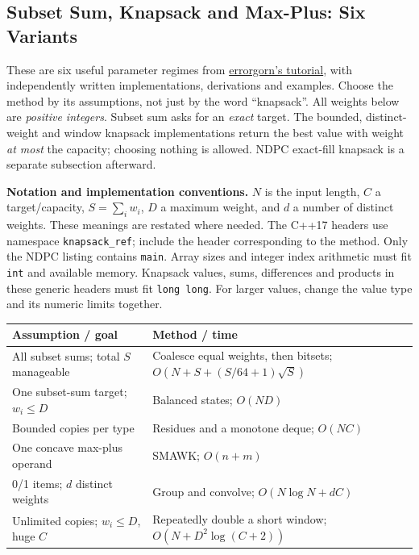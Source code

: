 \begingroup
\raggedright
\subsection{Subset Sum, Knapsack and Max-Plus: Six Variants}
\label{sec:knapsack-six}
These are six useful parameter regimes from
\href{https://codeforces.com/blog/entry/98663}{errorgorn's tutorial},
with independently written implementations, derivations and examples.
Choose the method by its assumptions, not just by the word ``knapsack''.
All weights below are \emph{positive integers}. Subset sum asks for an
\emph{exact} target. The bounded, distinct-weight and window knapsack
implementations return the best value with weight \emph{at most} the
capacity; choosing nothing is allowed. NDPC exact-fill knapsack is a
separate subsection afterward.

\textbf{Notation and implementation conventions.}
$N$ is the input length, $C$ a target/capacity, $S=\sum_i w_i$,
$D$ a maximum weight, and $d$ a number of distinct weights.
These meanings are restated where needed.
The C++17 headers use namespace \texttt{knapsack\_ref}; include the
header corresponding to the method. Only the NDPC listing contains
\texttt{main}. Array sizes and integer index arithmetic must fit
\texttt{int} and available memory. Knapsack values, sums, differences
and products in these generic headers must fit \texttt{long long}.
For larger values, change the value type and its numeric limits together.

\begin{center}
\begin{tabular}{p{}p{}}
\textbf{Assumption / goal} & \textbf{Method / time} \\
\hline
All subset sums; total $S$ manageable & Coalesce equal weights, then bitsets; $O(N+S+(S/64+1)\sqrt S)$ \\
One subset-sum target; $w_i\le D$ & Balanced states; $O(ND)$ \\
Bounded copies per type & Residues and a monotone deque; $O(NC)$ \\
One concave max-plus operand & SMAWK; $O(n+m)$ \\
0/1 items; $d$ distinct weights & Group and convolve; $O(N\log N+dC)$ \\
Unlimited copies; $w_i\le D$, huge $C$ & Repeatedly double a short window; $O(N+D^2\log(C+2))$ \\
\end{tabular}
\end{center}

